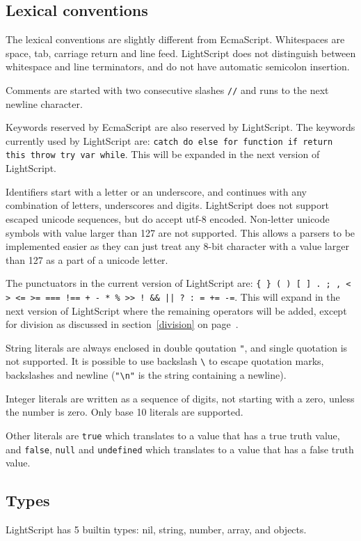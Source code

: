 \documentclass[11pt]{report}
\begin{document}
\subsection{Lexical conventions}
The lexical conventions are slightly different from EcmaScript. 
Whitespaces are space, tab, carriage return and line feed. 
LightScript does not distinguish between whitespace and line terminators, and do not have automatic semicolon insertion.

Comments are started with two consecutive slashes \verb|//| and runs to the next newline character.

Keywords reserved by EcmaScript are also reserved by LightScript. The keywords currently used by LightScript are: {\tt catch do else for function if return this throw try var while}. This will be expanded in the next version of LightScript.

Identifiers start with a letter or an underscore, and continues with any combination of letters, underscores and digits. 
LightScript does not support escaped unicode sequences, but do accept utf-8 encoded. Non-letter unicode symbols with value larger than 127 are not supported. This allows a parsers to be implemented easier as they can just treat any 8-bit character with a value larger than 127 as a part of a unicode letter.

The punctuators in the current version of LightScript are: {\tt \verb|{| \verb|}| ( ) [ ] . ; , < > <= >= === !== + - * \% >> ! \&\& || ? : = += -=}. 
This will expand in the next version of LightScript where the remaining operators will be added, except for division as discussed in section~\ref{division} on page~\pageref{division}.

String literals are always enclosed in double qoutation \verb|"|, and single quotation is not supported. It is possible to use backslash \verb|\| to escape quotation marks, backslashes and newline (\verb|"\n"| is the string containing a newline).

Integer literals are written as a sequence of digits, not starting with a zero, unless the number is zero. Only base 10 literals are supported.

Other literals are \verb|true| which translates to a value that has a true truth value, and \verb|false|, \verb|null| and \verb|undefined| which translates to a value that has a false truth value.

\subsection{Types}
LightScript has 5 builtin types: nil, string, number, array, and objects.
\end{document}
